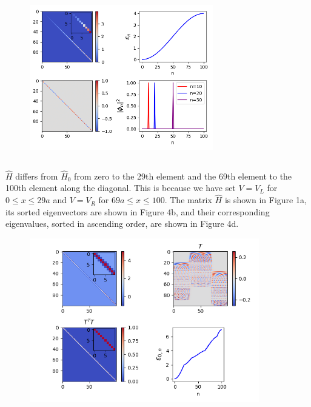 \documentclass[%
 reprint,
 amsmath,amssymb,
 aps,
]{revtex4-2}
\begin{document}
\begin{figure}[t!]
\centering
\includegraphics[width=8cm]{p1_3}
\caption{}
\label{fig:method}
\end{figure}

\subsection{}

$\hat{H}$ differs from $\hat{H}_{0}$ from zero to the 29th element and the 69th element to the 100th element along the diagonal. This is because we have set $V=V_{L}$ for $0 \leq x \leq 29a$ and $V=V_{R}$ for $69a\leq x \leq 100$. The matrix $\hat{H}$ is shown in Figure 1a, its sorted eigenvectors are shown in Figure 4b, and their corresponding eigenvalues, sorted in ascending order, are shown in Figure 4d. 

\begin{figure}[t!]
\centering
\includegraphics[width=10cm]{p1_5}
\caption{}
\label{fig:method}
\end{figure}
\end{document}
